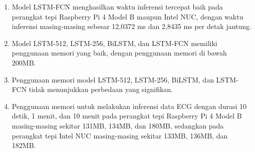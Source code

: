 \begin{enumerate}[leftmargin=0.5cm]
\begin{enumerate}
    \item Model LSTM-FCN menghasilkan waktu inferensi tercepat baik pada perangkat tepi Raspberry Pi 4 Model B maupun Intel NUC, dengan waktu inferensi masing-masing sebesar 12,0372 ms dan 2,8435 ms per detak jantung.
    \item Model LSTM-512, LSTM-256, BiLSTM, dan LSTM-FCN memiliki penggunaan memori yang baik, dengan penggunaan memori di bawah 200MB.
    \item Penggunaan memori model LSTM-512, LSTM-256, BiLSTM, dan LSTM-FCN tidak menunjukkan perbedaan yang signifikan.
    \item Penggunaan memori untuk melakukan inferensi data ECG dengan durasi 10 detik, 1 menit, dan 10 menit pada perangkat tepi Raspberry Pi 4 Model B masing-masing sekitar 131MB, 134MB, dan 180MB, sedangkan pada perangkat tepi Intel NUC masing-masing sekitar 133MB, 136MB, dan 182MB.
  \end{enumerate}
\end{enumerate}

